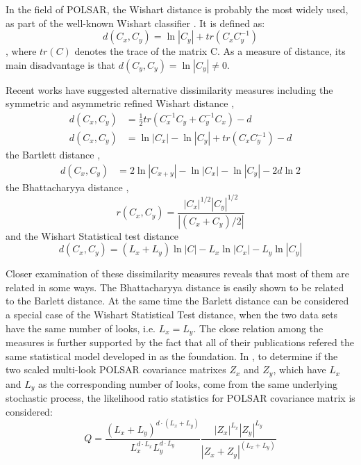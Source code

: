 \documentclass[journal]{IEEEtran}
\begin{document}
In the field of POLSAR, the Wishart distance is probably the most widely used, as part of the well-known Wishart classifier \cite{Lee_1999_TGRS}.
It is defined \cite{Lee_1994_IJRS_2299} as:
\begin{equation}
  d(C_x,C_y) = \ln|C_y| + tr(C_xC_y^{-1})
\end{equation},
where $tr(C)$ denotes the trace of the matrix C. 
As a measure of distance, its main disadvantage is that $d(C_y,C_y) = \ln|C_y| \neq 0$.

Recent works have suggested alternative dissimilarity measures including the symmetric and asymmetric refined Wishart distance \cite{Anfinsen_2007_ESA_POLINSAR},
\begin{align}
  d(C_x,C_y) &= \frac{1}{2} tr(C_x^{-1}C_y + C_y^{-1}C_x) - d \\
    d(C_x,C_y) &= \ln|C_x| - \ln|C_y| + tr(C_xC_y^{-1}) - d
\end{align}
the Bartlett distance \cite{Kersten_2005_TGRS_519},
  \begin{align}
  d(C_x,C_y) &= 2 \ln |C_{x+y}| - \ln |C_x| - \ln |C_y| - 2d\ln2
  \end{align}
the Bhattacharyya distance \cite{Lee_2011_IGARSS_3740},
\begin{equation}
  r(C_x,C_y) = \frac{|C_x|^{1/2} |C_y|^{1/2}}{|(C_x+C_y)/2|}
\end{equation}
and the Wishart Statistical test distance \cite{Cao_2007_TGRS_3454}
\begin{equation}
  d(C_x,C_y) = (L_x + L_y) \ln|C| - L_x \ln|C_x| - L_y\ln|C_y|
\end{equation}

Closer examination of these dissimilarity measures reveals that most of them are related in some ways. %
The Bhattacharyya distance is easily shown to be related to the Barlett distance.
At the same time the Barlett distance can be considered a special case of the Wishart Statistical Test distance,
  when the two data sets have the same number of looks, i.e. $L_x=L_y$.
The close relation among the measures is further supported by the fact that
  all of their publications refered the same statistical model developed in \cite{Conradsen_2003_TGRS_4} as the foundation.
In \cite{Conradsen_2003_TGRS_4}, to determine if the two scaled multi-look POLSAR covariance matrixes $Z_x$ and $Z_y$,
  which have $L_x$ and $L_y$ as the corresponding number of looks,
  come from the same underlying stochastic process,
the likelihood ratio statistics for POLSAR covariance matrix is considered:  
\begin{equation*}
  Q = \frac{(L_x+L_y)^{d \cdot (L_x+L_y)}}{L_x^{d \cdot L_x} L_y^{d \cdot L_y}} \frac{|Z_x|^{L_x} |Z_y|^{L_y} }{|Z_x+Z_y|^{(L_x+L_y)}}
\end{equation*}
\end{document}
